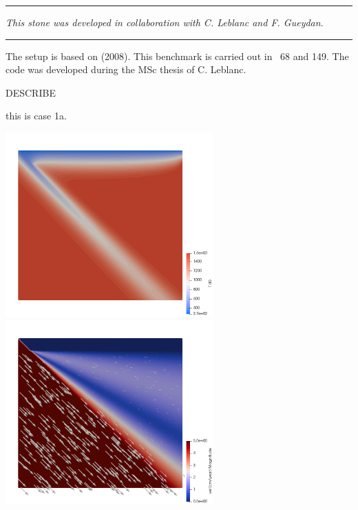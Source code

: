 \par\noindent\rule{\textwidth}{0.4pt}

{\sl This stone was developed in collaboration with C. Leblanc and F. Gueydan}. 

\par\noindent\rule{\textwidth}{0.4pt}


The setup is based on \textcite{vack08} (2008). This benchmark is carried out in \stone~68 and 149.
The code was developed during the MSc thesis of C. Leblanc. 

DESCRIBE

this is case 1a. 


\begin{center}
\includegraphics[width=8cm]{python_codes/fieldstone_152/results/T}
\includegraphics[width=8cm]{python_codes/fieldstone_152/results/vel}
\end{center}









